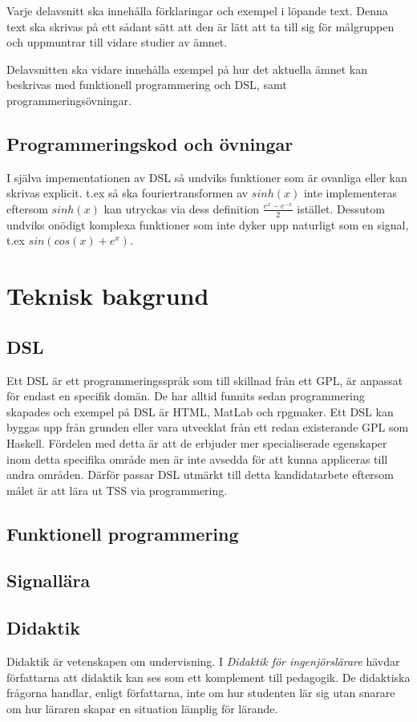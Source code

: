\documentclass[]{article}
\begin{document}
Varje delavsnitt ska innehålla förklaringar och exempel i löpande text. Denna text ska skrivas på ett sådant sätt att den är lätt att ta till sig för målgruppen och uppmuntrar till vidare studier av ämnet.

Delavsnitten ska vidare innehålla exempel på hur det aktuella ämnet kan beskrivas med funktionell programmering och DSL, samt programmeringsövningar.

\subsection{Programmeringskod och övningar}

I själva impementationen av DSL så undviks funktioner som är
ovanliga eller kan skrivas explicit. t.ex så ska fouriertransformen av
$sinh(x)$ inte implementeras eftersom $sinh(x)$ kan utryckas via dess
definition $\frac{e^{x} - e^{-x}}{2}$ istället.
Dessutom undviks onödigt komplexa funktioner som inte
dyker upp naturligt som en signal, t.ex $sin(cos(x)+e^x)$.

\section{Teknisk bakgrund}

\subsection{DSL}
Ett DSL är ett programmeringsspråk som till skillnad från ett \gls{GPL}, är anpassat
för endast en specifik domän. De har alltid funnits sedan programmering
skapades och exempel på DSL är HTML, MatLab och rpgmaker. Ett DSL kan
byggas upp från grunden eller vara utvecklat från ett redan existerande GPL
som Haskell. Fördelen med detta är att de erbjuder mer specialiserade egenskaper
inom detta specifika område men är inte avsedda för att kunna appliceras till andra
områden. Därför passar DSL utmärkt till detta kandidatarbete eftersom målet är
att lära ut TSS via programmering.

\subsection{Funktionell programmering}

\subsection{Signallära}

\subsection{Didaktik}
Didaktik är vetenskapen om undervisning. I \textit{Didaktik för ingenjörslärare} hävdar författarna att 
didaktik kan ses som ett komplement till pedagogik. De didaktiska frågorna handlar, enligt författarna, 
inte om hur studenten lär sig utan snarare om hur läraren skapar en situation lämplig för lärande. 
\end{document}
